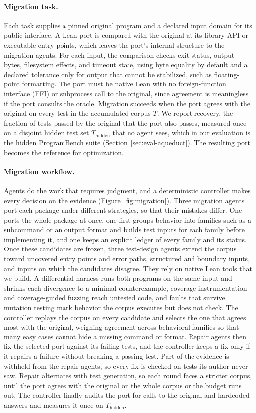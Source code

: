 \documentclass{article}
\begin{document}
\paragraph{Migration task.}
Each task supplies a pinned original program and a declared input domain for its public interface.
A Lean port is compared with the original at its library API or executable entry points, which leaves the port's internal structure to the migration agents.
For each input, the comparison checks exit status, output bytes, filesystem effects, and timeout state, using byte equality by default and a declared tolerance only for output that cannot be stabilized, such as floating-point formatting.
The port must be native Lean with no foreign-function interface (FFI) or subprocess call to the original, since agreement is meaningless if the port consults the oracle.
Migration succeeds when the port agrees with the original on every test in the accumulated corpus $T$.
We report recovery, the fraction of tests passed by the original that the port also passes, measured once on a disjoint hidden test set $T_{\mathrm{hidden}}$ that no agent sees, which in our evaluation is the hidden ProgramBench suite (Section~\ref{sec:eval-aqueduct}).
The resulting port becomes the reference for optimization.

\paragraph{Migration workflow.}
Agents do the work that requires judgment, and a deterministic controller makes every decision on the evidence (Figure~\ref{fig:migration}).
Three migration agents port each package under different strategies, so that their mistakes differ.
One ports the whole package at once, one first groups behavior into families such as a subcommand or an output format and builds test inputs for each family before implementing it, and one keeps an explicit ledger of every family and its status.
Once these candidates are frozen, three test-design agents extend the corpus toward uncovered entry points and error paths, structured and boundary inputs, and inputs on which the candidates disagree.
They rely on native Lean tools that we build.
A differential harness runs both programs on the same input and shrinks each divergence to a minimal counterexample, coverage instrumentation and coverage-guided fuzzing reach untested code, and faults that survive mutation testing mark behavior the corpus executes but does not check.
The controller replays the corpus on every candidate and selects the one that agrees most with the original, weighing agreement across behavioral families so that many easy cases cannot hide a missing command or format.
Repair agents then fix the selected port against its failing tests, and the controller keeps a fix only if it repairs a failure without breaking a passing test.
Part of the evidence is withheld from the repair agents, so every fix is checked on tests its author never saw.
Repair alternates with test generation, so each round faces a stricter corpus, until the port agrees with the original on the whole corpus or the budget runs out.
The controller finally audits the port for calls to the original and hardcoded answers and measures it once on $T_{\mathrm{hidden}}$.
\end{document}
